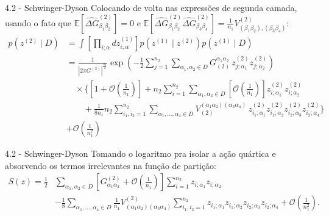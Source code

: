 \documentclass{beamer}
\begin{document}
\begin{frame}{4.2 - Schwinger-Dyson}
    \footnotesize
    Colocando de volta nas expressões de segunda camada, usando o fato que $\mathbb{E}[\widehat{\Delta G}_{\beta_1 \beta_2}^{(2)}]=0$ e $\mathbb{E}[\widehat{\Delta G}_{\beta_1 \beta_2}^{(2)}\widehat{\Delta G}_{\beta_3\beta_4}^{(2)}]=\frac{1}{n_1}V^{(2)}_{(\beta_1\beta_2),(\beta_3\beta_4)}$:
    \begin{align*}
        p\left(z^{(2)} \mid D\right) &= \int \left[\prod_{i;\alpha} dz^{(1)}_{i;\alpha}\right]p(z^{(1)} \mid z^{(2)}) p(z^{(1)} \mid D) \\
        &= \frac{1}{\left| 2\pi G^{(2)} \right|^{\frac{n_2}{2}} }
        \exp\left(
            -\frac{1}{2} \sum_{j=1}^{n_2} \sum_{\alpha_1, \alpha_2 \in D}
            G_{(2)}^{\alpha_1 \alpha_2} \, z^{(2)}_{j;\alpha_1} z^{(2)}_{j;\alpha_2}
        \right) \nonumber \\
        &\quad \times \Bigg\{
        \left[1 + \mathcal{O}\left(\frac{1}{n_1}\right)\right]
        + n_2 \sum_{i=1}^{n_2} \sum_{\alpha_1, \alpha_2 \in D}
        \left[ \mathcal{O}\left(\frac{1}{n_1}\right) \right]
        z^{(2)}_{i;\alpha_1} z^{(2)}_{i;\alpha_2} \nonumber \\
        &\quad\quad
        + \frac{1}{8n_1} n_2 \sum_{i_1, i_2 = 1}^{n_2}
        \sum_{\alpha_1, \dots, \alpha_4 \in D}
        V_{(2)}^{(\alpha_1 \alpha_2)(\alpha_3 \alpha_4)} \,
        z^{(2)}_{i_1;\alpha_1} z^{(2)}_{i_1;\alpha_2}
        z^{(2)}_{i_2;\alpha_3} z^{(2)}_{i_2;\alpha_4}
        \Bigg\} \\
        &+ \mathcal{O}\left( \frac{1}{n_1^2} \right)
    \end{align*}
\end{frame}

\begin{frame}{4.2 - Schwinger-Dyson}
    Tomando o logaritmo pra isolar a ação quártica e absorvendo os termos irrelevantes na função de partição:
    \footnotesize
    \begin{align*}
        S(z) = \frac{1}{2} &\sum_{\alpha_1,\alpha_2 \in D} \left[ G^{(2)}_{\alpha_1 \alpha_2} + \mathcal{O}\left( \frac{1}{n_1} \right) \right] \sum_{i=1}^{n_2} z_{i;\alpha_1} z_{i;\alpha_2} \\
        &- \frac{1}{8} \sum_{\alpha_1,\dots,\alpha_4 \in D} \frac{1}{n_1} V^{(2)}_{(\alpha_1 \alpha_2)(\alpha_3 \alpha_4)} \sum_{i_1,i_2=1}^{n_2} z_{i_1;\alpha_1} z_{i_1;\alpha_2} z_{i_2;\alpha_3} z_{i_2;\alpha_4}
        + \mathcal{O}\left( \frac{1}{n_1^2} \right).
    \end{align*}
\end{frame}
\end{document}
